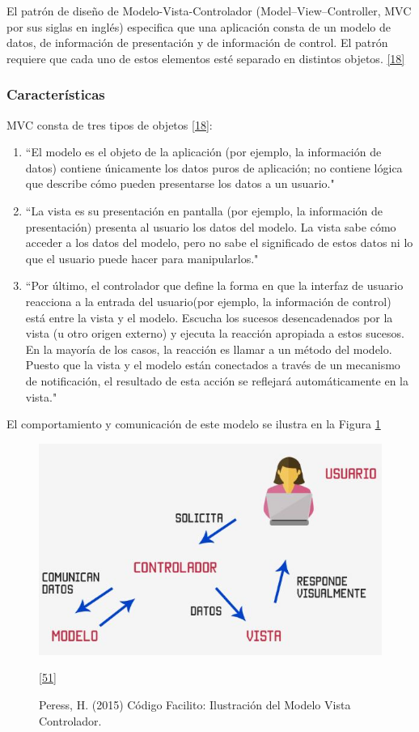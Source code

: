 El patrón de diseño de Modelo-Vista-Controlador (Model–View–Controller, MVC por sus siglas en inglés) especifica que una aplicación consta de un modelo de datos, de información de presentación y de información de control. El patrón requiere que cada uno de estos elementos esté separado en distintos objetos. \hyperlink{b18}{[18]}

\subsubsection{Características}
MVC consta de tres tipos de objetos \hyperlink{b18}{[18]}: 
\begin{enumerate}
\item ``El modelo es el objeto de la aplicación (por ejemplo, la información de datos) contiene únicamente los datos puros de aplicación; no contiene lógica que describe cómo pueden presentarse los datos a un usuario."
\item ``La vista es su presentación en pantalla  (por ejemplo, la información de presentación) presenta al usuario los datos del modelo. La vista sabe cómo acceder a los datos del modelo, pero no sabe el significado de estos datos ni lo que el usuario puede hacer para manipularlos."
\item ``Por último, el controlador que  define la forma en que la interfaz de usuario reacciona a la entrada del usuario(por ejemplo, la información de control) está entre la vista y el modelo. Escucha los sucesos desencadenados por la vista (u otro origen externo) y ejecuta la reacción apropiada a estos sucesos. En la mayoría de los casos, la reacción es llamar a un método del modelo. Puesto que la vista y el modelo están conectados a través de un mecanismo de notificación, el resultado de esta acción se reflejará automáticamente en la vista."
\end{enumerate}

El comportamiento y comunicación de este modelo se ilustra en la Figura \ref{fig:mvc}

\begin{figure}[H]
	\begin{center}
		\includegraphics[width=.75\textwidth]{images/marcoteorico/mvc}
		\caption{Peress, H. (2015) Código Facilito: Ilustración del Modelo Vista Controlador.}
		\hyperlink{b51}{[51]} 
		\label{fig:mvc}
	\end{center}
\end{figure}

